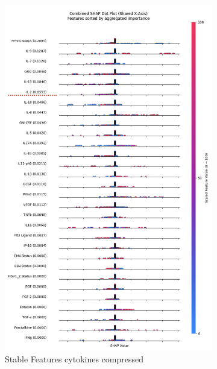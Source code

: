 \documentclass[12pt,a4paper]{report}
\begin{document}
\begin{figure}[H]
    \begin{subfigure}[b]{0.48\textwidth}
        \centering
        \includegraphics[width=\textwidth]{images/stable_features_cytokines.png}
        \caption{Stable Features cytokines compressed}
        \label{fig:stable_features_cytokines_compressed}
    \end{subfigure}
    \hfill
    \begin{subfigure}[b]{0.48\textwidth}
        \centering

\end{subfigure}
\end{figure}
\end{document}
